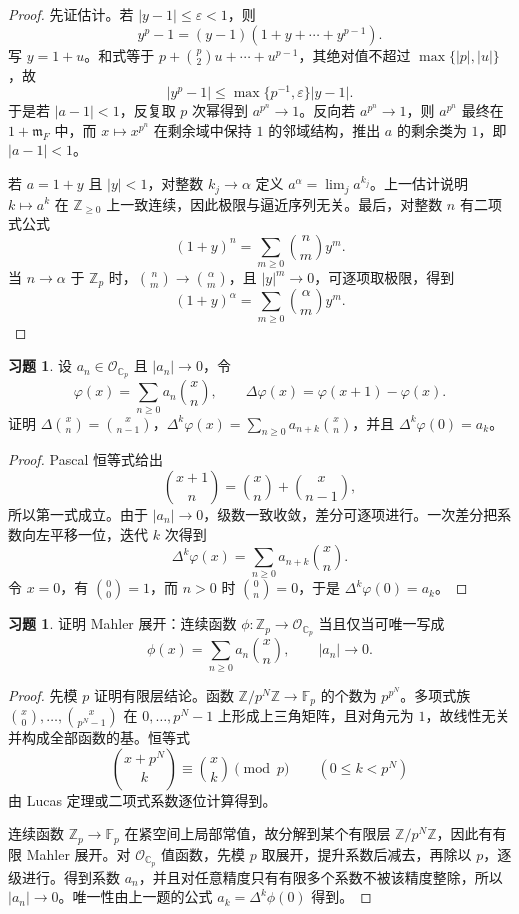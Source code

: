 \documentclass[11pt,a4paper,openany]{ctexbook}
\numberwithin{equation}{chapter}
\newcommand{\C}{\mathbb{C}}
\newcommand{\Z}{\mathbb{Z}}
\newcommand{\F}{\mathbb{F}}
\theoremstyle{plain}
\theoremstyle{definition}
\newtheorem{exercise}[theorem]{习题}
\theoremstyle{remark}
\begin{document}
\begin{proof}
先证估计。若 $|y-1|\le\varepsilon<1$，则
\[
  y^p-1=(y-1)(1+y+\cdots+y^{p-1}).
\]
写 $y=1+u$。和式等于 $p+\binom p2u+\cdots+u^{p-1}$，其绝对值不超过 $\max\{|p|,|u|\}$，故
\[
  |y^p-1|\le\max\{p^{-1},\varepsilon\}|y-1|.
\]
于是若 $|a-1|<1$，反复取 $p$ 次幂得到 $a^{p^n}\to1$。反向若 $a^{p^n}\to1$，则 $a^{p^n}$ 最终在 $1+\mathfrak m_F$ 中，而 $x\mapsto x^{p^n}$ 在剩余域中保持 $1$ 的邻域结构，推出 $a$ 的剩余类为 $1$，即 $|a-1|<1$。

若 $a=1+y$ 且 $|y|<1$，对整数 $k_j\to\alpha$ 定义 $a^\alpha=\lim_j a^{k_j}$。上一估计说明 $k\mapsto a^k$ 在 $\Z_{\ge0}$ 上一致连续，因此极限与逼近序列无关。最后，对整数 $n$ 有二项式公式
\[
  (1+y)^n=\sum_{m\ge0}\binom nm y^m.
\]
当 $n\to\alpha$ 于 $\Z_p$ 时，$\binom nm\to\binom\alpha m$，且 $|y|^m\to0$，可逐项取极限，得到
\[
  (1+y)^\alpha=\sum_{m\ge0}\binom\alpha m y^m.
\]
\end{proof}

\begin{exercise}
设 $a_n\in\mathcal O_{\C_p}$ 且 $|a_n|\to0$，令
\[
  \varphi(x)=\sum_{n\ge0}a_n\binom{x}{n},\qquad
  \Delta\varphi(x)=\varphi(x+1)-\varphi(x).
\]
证明 $\Delta\binom{x}{n}=\binom{x}{n-1}$，$\Delta^k\varphi(x)=\sum_{n\ge0}a_{n+k}\binom{x}{n}$，并且 $\Delta^k\varphi(0)=a_k$。
\end{exercise}

\begin{proof}
Pascal 恒等式给出
\[
  \binom{x+1}{n}=\binom{x}{n}+\binom{x}{n-1},
\]
所以第一式成立。由于 $|a_n|\to0$，级数一致收敛，差分可逐项进行。一次差分把系数向左平移一位，迭代 $k$ 次得到
\[
  \Delta^k\varphi(x)=\sum_{n\ge0}a_{n+k}\binom{x}{n}.
\]
令 $x=0$，有 $\binom00=1$，而 $n>0$ 时 $\binom0n=0$，于是 $\Delta^k\varphi(0)=a_k$。
\end{proof}

\begin{exercise}
证明 Mahler 展开：连续函数 $\phi:\Z_p\to\mathcal O_{\C_p}$ 当且仅当可唯一写成
\[
  \phi(x)=\sum_{n\ge0}a_n\binom{x}{n},\qquad |a_n|\to0.
\]
\end{exercise}

\begin{proof}
先模 $p$ 证明有限层结论。函数 $\Z/p^N\Z\to\F_p$ 的个数为 $p^{p^N}$。多项式族 $\binom{x}{0},\ldots,\binom{x}{p^N-1}$ 在 $0,\ldots,p^N-1$ 上形成上三角矩阵，且对角元为 $1$，故线性无关并构成全部函数的基。恒等式
\[
  \binom{x+p^N}{k}\equiv \binom{x}{k}\pmod p\qquad(0\le k<p^N)
\]
由 Lucas 定理或二项式系数逐位计算得到。

连续函数 $\Z_p\to\F_p$ 在紧空间上局部常值，故分解到某个有限层 $\Z/p^N\Z$，因此有有限 Mahler 展开。对 $\mathcal O_{\C_p}$ 值函数，先模 $p$ 取展开，提升系数后减去，再除以 $p$，逐级进行。得到系数 $a_n$，并且对任意精度只有有限多个系数不被该精度整除，所以 $|a_n|\to0$。唯一性由上一题的公式 $a_k=\Delta^k\phi(0)$ 得到。
\end{proof}
\end{document}
